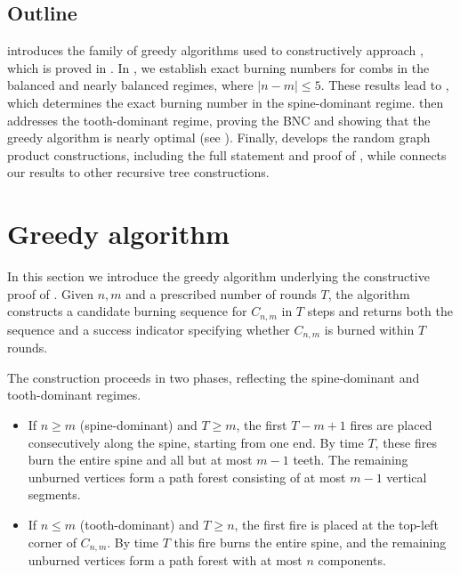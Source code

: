 \documentclass{article}
\begin{document}
\subsection{Outline}

 introduces the family of greedy algorithms used to constructively approach , which is proved in . In , we establish exact burning numbers for combs in the balanced and nearly balanced regimes, where $|n-m| \le 5$. These results lead to , which determines the exact burning number in the spine-dominant regime.  then addresses the tooth-dominant regime, proving the BNC and showing that the greedy algorithm is nearly optimal (see ). Finally,  develops the random graph product constructions, including the full statement and proof of , while  connects our results to other recursive tree constructions.



\section{Greedy algorithm}\label{sec: greedy}

In this section we introduce the greedy algorithm underlying the constructive proof of .  
Given $n,m$ and a prescribed number of rounds $T$, the algorithm constructs a candidate burning sequence for $C_{n,m}$ in $T$ steps and returns both the sequence and a success indicator specifying whether $C_{n,m}$ is burned within $T$ rounds.

The construction proceeds in two phases, reflecting the spine-dominant and tooth-dominant regimes.

\begin{itemize}
    \item If $n \ge m$ (spine-dominant) and $T \ge m$, the first $T-m+1$ fires are placed consecutively along the spine, starting from one end. By time $T$, these fires burn the entire spine and all but at most $m-1$ teeth. The remaining unburned vertices form a path forest consisting of at most $m-1$ vertical segments.

    \item If $n \le m$ (tooth-dominant) and $T \ge n$, the first fire is placed at the top-left corner of $C_{n,m}$. By time $T$ this fire burns the entire spine, and the remaining unburned vertices form a path forest with at most $n$ components.
\end{itemize}
\end{document}
